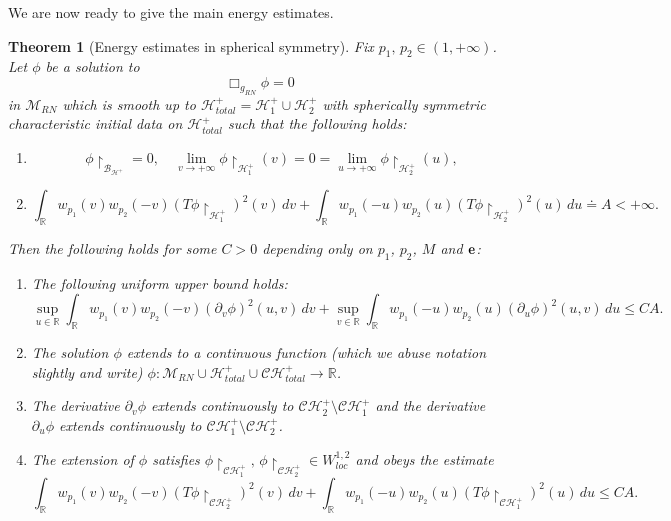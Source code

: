\documentclass[10pt, reqno]{amsart}
\newtheorem{theorem}{Theorem}[section]
\theoremstyle{definition}
\theoremstyle{remark}
\numberwithin{equation}{section}
\newcommand{\rd}{\partial}
\newcommand{\0}{\emptyset}
\newcommand{\calC}{\mathcal C}
\newcommand{\calH}{\mathcal H}
\newcommand{\CH}{\calC \calH^{+}}		%
\newcommand{\EH}{\calH^{+}}
\begin{document}
We are now ready to give the main energy estimates.

\begin{theorem}[Energy estimates in spherical symmetry]\label{scat.SS}
Fix $p_1,\,p_2\in (1,+\infty)$. Let $\phi$ be a solution to 
$$\Box_{g_{RN}} \phi = 0$$
in $\mathcal M_{RN}$ which is smooth up to $\EH_{total} = \EH_1 \cup \EH_2$ with spherically symmetric characteristic initial data on $\EH_{total}$ such that the following holds:
\begin{enumerate}
\item $$\phi\restriction_{\mathcal B_{\EH}} = 0,\quad \lim_{v\to +\infty} \phi\restriction_{\EH_1}(v) = 0 = \lim_{u\to +\infty} \phi\restriction_{\EH_2}(u),$$
\item \begin{equation}\label{eq:def.A.in.EE}
\int_{\mathbb R} w_{p_1}(v)w_{p_2}(-v)(T\phi\restriction_{\EH_1})^2(v)\,dv + \int_{\mathbb R} w_{p_1}(-u)w_{p_2}(u)(T\phi \restriction_{\EH_2})^2(u)\,du \doteq A <+\infty.
\end{equation}
\end{enumerate}

Then the following holds for some $C>0$ depending only on $p_1$, $p_2$, $M$ and $\bf e$:
\begin{enumerate}
\item The following uniform upper bound holds:
\begin{equation}\label{eq:main.energy.est}
\sup_{u\in \mathbb R} \int_{\mathbb R} w_{p_1}(v)w_{p_2}(-v)(\rd_v\phi)^2(u,v)\,dv + \sup_{v\in \mathbb R} \int_{\mathbb R} w_{p_1}(-u)w_{p_2}(u)(\rd_u\phi)^2(u,v)\,d u \leq CA.
\end{equation}
\item The solution $\phi$ extends to a continuous function (which we abuse notation slightly and write) $\phi: \mathcal M_{RN}\cup \EH_{total} \cup \CH_{total}\to \mathbb R$.
\item The derivative $\rd_v\phi$ extends continuously to $\CH_2\setminus \CH_1$ and the derivative $\rd_u \phi$ extends continuously to $\CH_1 \setminus \CH_2$.
\item The extension of $\phi$ satisfies $\phi\restriction_{\CH_1},\,\phi \restriction_{\CH_2}\in W^{1,2}_{loc}$ and obeys the estimate 
\begin{equation}\label{eq:energy.est.on.CH}
\int_{\mathbb R} w_{p_1}(v)w_{p_2}(-v)(T\phi\restriction_{\CH_2})^2(v)\,dv + \int_{\mathbb R} w_{p_1}(-u)w_{p_2}(u)(T\phi \restriction_{\CH_1})^2(u)\,du \leq CA.
\end{equation}
\end{enumerate}
\end{theorem}
\end{document}
